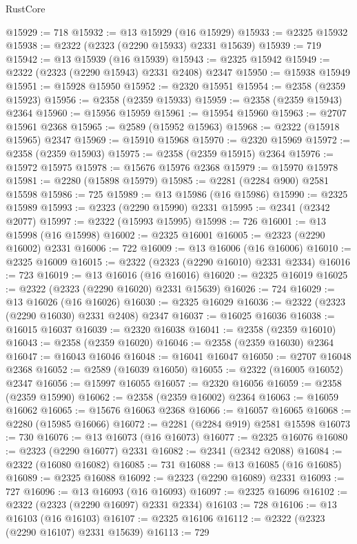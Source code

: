 \begin{lexlean}{RustCore}
\begin{coremodule}
@15929 := 718
@15932 := @13 @15929 (@16 @15929)
@15933 := @2325 @15932
@15938 := @2322 (@2323 (@2290 @15933) @2331 @15639)
@15939 := 719
@15942 := @13 @15939 (@16 @15939)
@15943 := @2325 @15942
@15949 := @2322 (@2323 (@2290 @15943) @2331 @2408) @2347
@15950 := @15938 @15949
@15951 := @15928 @15950
@15952 := @2320 @15951
@15954 := @2358 (@2359 @15923)
@15956 := @2358 (@2359 @15933)
@15959 := @2358 (@2359 @15943) @2364
@15960 := @15956 @15959
@15961 := @15954 @15960
@15963 := @2707 @15961 @2368
@15965 := @2589 (@15952 @15963)
@15968 := @2322 (@15918 @15965) @2347
@15969 := @15910 @15968
@15970 := @2320 @15969
@15972 := @2358 (@2359 @15903)
@15975 := @2358 (@2359 @15915) @2364
@15976 := @15972 @15975
@15978 := @15676 @15976 @2368
@15979 := @15970 @15978
@15981 := @2280 (@15898 @15979)
@15985 := @2281 (@2284 @900) @2581 @15598
@15986 := 725
@15989 := @13 @15986 (@16 @15986)
@15990 := @2325 @15989
@15993 := @2323 (@2290 @15990) @2331
@15995 := @2341 (@2342 @2077)
@15997 := @2322 (@15993 @15995)
@15998 := 726
@16001 := @13 @15998 (@16 @15998)
@16002 := @2325 @16001
@16005 := @2323 (@2290 @16002) @2331
@16006 := 722
@16009 := @13 @16006 (@16 @16006)
@16010 := @2325 @16009
@16015 := @2322 (@2323 (@2290 @16010) @2331 @2334)
@16016 := 723
@16019 := @13 @16016 (@16 @16016)
@16020 := @2325 @16019
@16025 := @2322 (@2323 (@2290 @16020) @2331 @15639)
@16026 := 724
@16029 := @13 @16026 (@16 @16026)
@16030 := @2325 @16029
@16036 := @2322 (@2323 (@2290 @16030) @2331 @2408) @2347
@16037 := @16025 @16036
@16038 := @16015 @16037
@16039 := @2320 @16038
@16041 := @2358 (@2359 @16010)
@16043 := @2358 (@2359 @16020)
@16046 := @2358 (@2359 @16030) @2364
@16047 := @16043 @16046
@16048 := @16041 @16047
@16050 := @2707 @16048 @2368
@16052 := @2589 (@16039 @16050)
@16055 := @2322 (@16005 @16052) @2347
@16056 := @15997 @16055
@16057 := @2320 @16056
@16059 := @2358 (@2359 @15990)
@16062 := @2358 (@2359 @16002) @2364
@16063 := @16059 @16062
@16065 := @15676 @16063 @2368
@16066 := @16057 @16065
@16068 := @2280 (@15985 @16066)
@16072 := @2281 (@2284 @919) @2581 @15598
@16073 := 730
@16076 := @13 @16073 (@16 @16073)
@16077 := @2325 @16076
@16080 := @2323 (@2290 @16077) @2331
@16082 := @2341 (@2342 @2088)
@16084 := @2322 (@16080 @16082)
@16085 := 731
@16088 := @13 @16085 (@16 @16085)
@16089 := @2325 @16088
@16092 := @2323 (@2290 @16089) @2331
@16093 := 727
@16096 := @13 @16093 (@16 @16093)
@16097 := @2325 @16096
@16102 := @2322 (@2323 (@2290 @16097) @2331 @2334)
@16103 := 728
@16106 := @13 @16103 (@16 @16103)
@16107 := @2325 @16106
@16112 := @2322 (@2323 (@2290 @16107) @2331 @15639)
@16113 := 729

\end{coremodule}
\end{lexlean}
